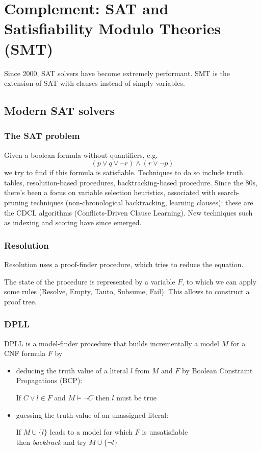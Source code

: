 \documentclass[toc]{../cs-classes/cs-classes}
\begin{document}
\newpage
\section{Complement: SAT and Satisfiability Modulo Theories (SMT)}
Since 2000, SAT solvers have become extremely performant. SMT is the extension of SAT with clauses instead of simply variables.
\subsection{Modern SAT solvers}
\subsubsection{The SAT problem}
Given a boolean formula without quantifiers, e.g.
\begin{equation*}
    (p\lor q\lor \lnot r)\land(r\lor \lnot p)
\end{equation*}
we try to find if this formula is satisfiable. Techniques to do so include truth tables, resolution-based procedures, backtracking-based procedure. Since the 80s, there's been a focus on variable selection heuristics, associated with search-pruning techniques (non-chronological backtracking, learning clauses): these are the CDCL algorithms (Conflicts-Driven Clause Learning). New techniques such as indexing and scoring have since emerged.

\subsubsection{Resolution}
Resolution uses a proof-finder procedure, which tries to reduce the equation.

The state of the procedure is represented by a variable $F$, to which we can apply some rules (Resolve, Empty, Tauto, Subsume, Fail). This allows to construct a proof tree.

\subsubsection{DPLL}
DPLL is a model-finder procedure that builds incrementally a model $M$ for a CNF formula $F$ by
\begin{itemize}
    \item deducing the truth value of a literal $l$ from $M$ and $F$ by Boolean Constraint Propagations (BCP):
    \begin{center}
        If $C\lor l\in F$ and $M\vDash \lnot C$ then $l$ must be true
    \end{center}
    \item guessing the truth value of an unassigned literal:
    \begin{center}
        If $M\cup\{l\}$ leads to a model for which $F$ is unsatisfiable\\ then \emph{backtrack} and try $M\cup\{\lnot l\}$
    \end{center}
\end{itemize}
\end{document}
